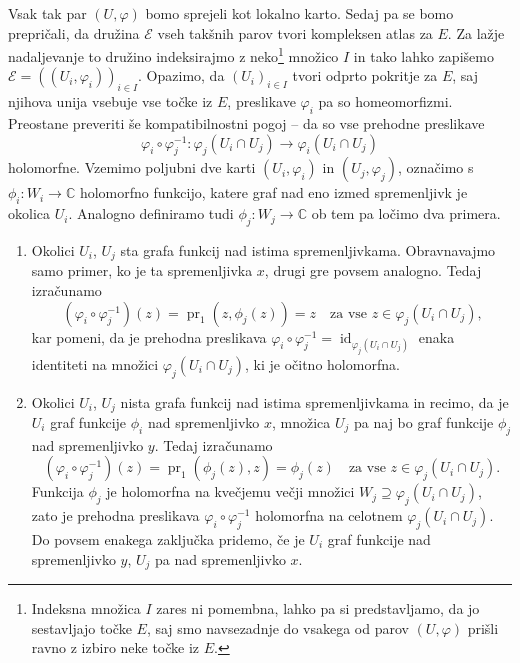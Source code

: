 \documentclass[mat1]{fmfdelo}
\numberwithin{equation}{section}
\newcommand{\C}{\mathbb C}
\newcommand{\inv}{^{-1}}
\DeclareMathOperator{\id}{id}
\DeclareMathOperator{\pr}{pr}
\theoremstyle{definition}
\begin{document}
Vsak tak par $(U, \varphi)$ bomo sprejeli kot lokalno karto. 
Sedaj pa se bomo prepričali, da družina $\mathcal{E}$ vseh takšnih parov tvori kompleksen atlas za $E$. Za lažje nadaljevanje to družino indeksirajmo z neko\footnote{Indeksna množica $I$ zares ni pomembna, lahko pa si predstavljamo, da jo sestavljajo točke $E$, saj smo navsezadnje do vsakega od parov $(U, \varphi)$ prišli ravno z izbiro neke točke iz $E$. } množico $I$ in tako lahko zapišemo $\mathcal{E} = ((U_i, \varphi_i))_{i \in I}$. 
Opazimo, da  
$(U_i)_{i \in I}$ tvori odprto pokritje za $E$, saj njihova unija vsebuje vse točke iz $E$, preslikave $\varphi_i$ pa so homeomorfizmi. Preostane preveriti še kompatibilnostni pogoj -- da so vse prehodne preslikave
\[
    \varphi_i \circ \varphi_j\inv : \varphi_j(U_i \cap U_j) \to \varphi_i(U_i \cap U_j)  
\]
holomorfne. Vzemimo poljubni dve karti $(U_i, \varphi_i)$ in $(U_j, \varphi_j)$, označimo s $\phi_i : W_i \to \C$ holomorfno funkcijo, katere graf nad eno izmed spremenljivk je okolica $U_i$. Analogno definiramo tudi $\phi_j : W_j \to \C$ ob tem pa ločimo dva primera. 
\begin{enumerate}
    \item Okolici $U_i$, $U_j$ sta grafa funkcij nad istima spremenljivkama. Obravnavajmo samo primer, ko je ta spremenljivka $x$, drugi gre povsem analogno. Tedaj izračunamo
    \[
        (\varphi_i \circ \varphi_j\inv)(z) = \pr_1(z, \phi_j(z)) = z \quad \text{za vse $z \in \varphi_j(U_i \cap U_j)$,}
    \] 
    kar pomeni, da je prehodna preslikava $\varphi_i \circ \varphi_j\inv = \id_{\varphi_j(U_i \cap U_j)}$ enaka identiteti na množici $\varphi_j(U_i \cap U_j)$, ki je očitno holomorfna. 

    \item Okolici $U_i$, $U_j$ nista grafa funkcij nad istima spremenljivkama in recimo, da je $U_i$ graf funkcije $\phi_i$ nad spremenljivko $x$, množica $U_j$ pa naj bo graf funkcije $\phi_j$ nad spremenljivko $y$. Tedaj izračunamo
    \[
        (\varphi_i \circ \varphi_j\inv)(z) = \pr_1(\phi_j(z), z) = \phi_j(z) \quad \text{za vse $z \in \varphi_j(U_i \cap U_j)$.}   
    \]
    Funkcija $\phi_j$ je holomorfna na kvečjemu večji množici $W_j \supseteq \varphi_j(U_i \cap U_j)$, zato je prehodna preslikava $\varphi_i \circ \varphi_j\inv$ holomorfna na celotnem $\varphi_j(U_i \cap U_j)$. Do povsem enakega zaključka pridemo, če je $U_i$ graf funkcije nad spremenljivko $y$, $U_j$ pa nad spremenljivko $x$. 
\end{enumerate} 
\end{document}
